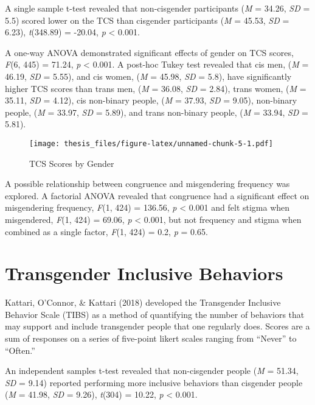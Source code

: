 \documentclass[12pt,twoside]{reedthesis}
\begin{document}
A single sample t-test revealed that non-cisgender participants (\emph{M} = 34.26, \emph{SD} = 5.5) scored lower on the TCS than cisgender participants (\emph{M} = 45.53, \emph{SD} = 6.23), \emph{t}(348.89) = -20.04, \emph{p} \textless{} 0.001.

A one-way ANOVA demonstrated significant effects of gender on TCS scores, \emph{F}(6, 445) = 71.24, \emph{p} \textless{} 0.001. A post-hoc Tukey test revealed that cis men, (\emph{M} = 46.19, \emph{SD} = 5.55), and cis women, (\emph{M} = 45.98, \emph{SD} = 5.8), have significantly higher TCS scores than trans men, (\emph{M} = 36.08, \emph{SD} = 2.84), trans women, (\emph{M} = 35.11, \emph{SD} = 4.12), cis non-binary people, (\emph{M} = 37.93, \emph{SD} = 9.05), non-binary people, (\emph{M} = 33.97, \emph{SD} = 5.89), and trans non-binary people, (\emph{M} = 33.94, \emph{SD} = 5.81).
\begin{figure}
\centering
\texttt{[image: thesis\_files/figure-latex/unnamed-chunk-5-1.pdf]}
\caption{\label{fig:unnamed-chunk-5}TCS Scores by Gender}
\end{figure}
A possible relationship between congruence and misgendering frequency was explored. A factorial ANOVA revealed that congruence had a significant effect on misgendering frequency, \emph{F}(1, 424) = 136.56, \emph{p} \textless{} 0.001 and felt stigma when misgendered, \emph{F}(1, 424) = 69.06, \emph{p} \textless{} 0.001, but not frequency and stigma when combined as a single factor, \emph{F}(1, 424) = 0.2, \emph{p} = 0.65.

\hypertarget{transgender-inclusive-behaviors}{%
\section{Transgender Inclusive Behaviors}\label{transgender-inclusive-behaviors}}

Kattari, O'Connor, \& Kattari (2018) developed the Transgender Inclusive Behavior Scale (TIBS) as a method of quantifying the number of behaviors that may support and include transgender people that one regularly does. Scores are a sum of responses on a series of five-point likert scales ranging from ``Never'' to ``Often.''

An independent samples t-test revealed that non-cisgender people (\emph{M} = 51.34, \emph{SD} = 9.14) reported performing more inclusive behaviors than cisgender people (\emph{M} = 41.98, \emph{SD} = 9.26), \emph{t}(304) = 10.22, \emph{p} \textless{} 0.001.
\end{document}
